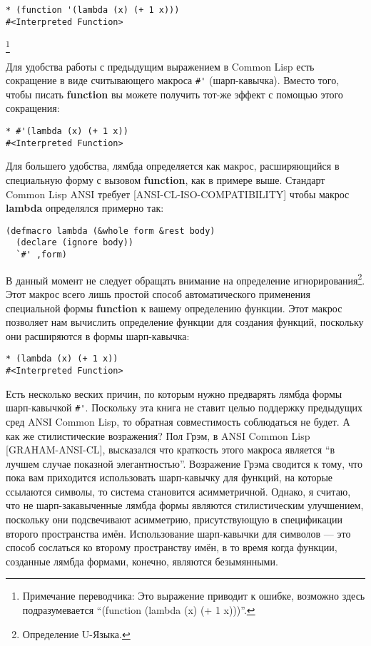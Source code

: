 \begin{verbatim}
* (function '(lambda (x) (+ 1 x)))
#<Interpreted Function>
\end{verbatim}

\footnote{Примечание переводчика: Это выражение приводит к ошибке, возможно здесь подразумевается ``(function (lambda (x) (+ 1 x)))''.}


Для удобства работы с предыдущим выражением в Common Lisp есть сокращение в виде считывающего макроса \verb"#'" (шарп-кавычка). Вместо того, чтобы писать \textbf{function} вы можете получить тот-же эффект с помощью этого сокращения:

\begin{verbatim}
* #'(lambda (x) (+ 1 x))
#<Interpreted Function>
\end{verbatim}

Для большего удобства, лямбда определяется как макрос, расширяющийся в специальную форму с вызовом \textbf{function}, как в примере выше. Стандарт Common Lisp ANSI требует [ANSI-CL-ISO-COMPATIBILITY] чтобы макрос \textbf{lambda} определялся примерно так:

\begin{verbatim}
(defmacro lambda (&whole form &rest body)
  (declare (ignore body))
  `#' ,form)
\end{verbatim}

В данный момент не следует обращать внимание на определение игнорирования\footnote{Определение U-Языка.}. Этот макрос всего лишь простой способ автоматического применения специальной формы \textbf{function} к вашему определению функции. Этот макрос позволяет нам вычислить определение функции для создания функций, поскольку они расширяются в формы шарп-кавычка:

\begin{verbatim}
* (lambda (x) (+ 1 x))
#<Interpreted Function>
\end{verbatim}

Есть несколько веских причин, по которым нужно предварять лямбда формы шарп-кавычкой \verb"#'". Поскольку эта книга не ставит целью поддержку предыдущих сред ANSI Common Lisp, то обратная совместимость соблюдаться не будет. А как же стилистические возражения? Пол Грэм, в ANSI Common Lisp [GRAHAM-ANSI-CL], высказался что краткость этого макроса является ``в лучшем случае показной элегантностью''. Возражение Грэма сводится к тому, что пока вам приходится использовать шарп-кавычку для функций, на которые ссылаются символы, то система становится асимметричной. Однако, я считаю, что не шарп-закавыченные лямбда формы являются стилистическим улучшением, поскольку они подсвечивают асимметрию, присутствующую в спецификации второго пространства имён. Использование шарп-кавычки для символов --- это способ сослаться ко второму пространству имён, в то время когда функции, созданные лямбда формами, конечно, являются безымянными.

